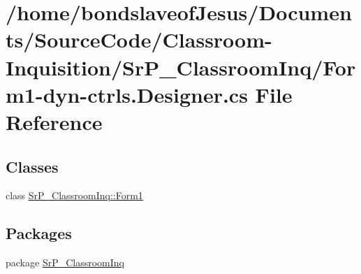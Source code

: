 \hypertarget{_form1-dyn-ctrls_8_designer_8cs}{
\section{/home/bondslaveof\-Jesus/\-Documents/\-Source\-Code/\-Classroom-\/\-Inquisition/\-Sr\-P\-\_\-\-Classroom\-Inq/\-Form1-\/dyn-\/ctrls.\-Designer.cs \-File \-Reference}
\label{_form1-dyn-ctrls_8_designer_8cs}
}
\subsection*{\-Classes}
\begin{DoxyCompactItemize}
\item 
class \hyperlink{class_sr_p___classroom_inq_1_1_form1}{\-Sr\-P\-\_\-\-Classroom\-Inq\-::\-Form1}
\end{DoxyCompactItemize}
\subsection*{\-Packages}
\begin{DoxyCompactItemize}
\item 
package \hyperlink{namespace_sr_p___classroom_inq}{\-Sr\-P\-\_\-\-Classroom\-Inq}
\end{DoxyCompactItemize}
